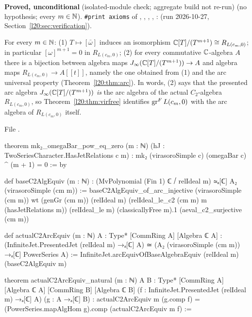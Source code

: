 \begin{status}
\textbf{Proved, unconditional} (isolated-module check; aggregate build not re-run) (no hypothesis; every $m\in{\mathbb{N}}$). \texttt{\#print axioms} of ,
, , , :
 (run 2026-10-27, Section~\ref{l20:sec:verification}).
\end{status}

\begin{theorem}\label{l20:thm:virc2}
For every $m\in{\mathbb{N}}$: (1) $T\mapsto[\bar\omega]$ induces an isomorphism ${\mathbb{C}}[T]/(T^{m+1})\cong R_{L(c_m,0)}$; in particular
$[\omega]^{m+1}=0$ in $R_{L(c_m,0)}$; (2) for every commutative ${\mathbb{C}}$-algebra $A$ there is a bijection between algebra maps
$J_\infty({\mathbb{C}}[T]/(T^{m+1}))\to A$ and algebra maps $R_{L(c_m,0)}\to A[[t]]$, namely the one obtained from (1) and the arc universal
property (Theorem~\ref{l20:thm:arc}). In words, (2) says that the presented arc algebra $J_\infty({\mathbb{C}}[T]/(T^{m+1}))$
\emph{is} the arc algebra of the actual $C_2$-algebra $R_{L(c_m,0)}$, so Theorem~\ref{l20:thm:virfree} identifies $\operatorname{gr}^F L(c_m,0)$
with the arc algebra of $R_{L(c_m,0)}$ itself.
\end{theorem}
\noindent File .
\begin{leancode}
theorem mk₂_omegaBar_pow_eq_zero (m : ℕ) (hJ : TwoSeriesCharacter.HasJetRelations c m) :
    mk₂ (virasoroSimple c) (omegaBar c) ^ (m + 1) = 0 := by

def baseC2AlgEquiv (m : ℕ) :
    (MvPolynomial (Fin 1) ℂ ⧸ relIdeal m) ≃ₐ[ℂ] A₂ (virasoroSimple (cm m)) :=
  baseC2AlgEquiv_of_arc_injective (virasoroSimple (cm m)) wt (genGr (cm m)) (relIdeal m)
    (relIdeal_le_c2 (cm m) m (hasJetRelations m)) (relIdeal_le m) (classicallyFree m).1
    (aeval_c2_surjective (cm m))

def actualC2ArcEquiv (m : ℕ) {A : Type*} [CommRing A] [Algebra ℂ A] :
    (InfiniteJet.PresentedJet (relIdeal m) →ₐ[ℂ] A) ≃
      (A₂ (virasoroSimple (cm m)) →ₐ[ℂ] PowerSeries A) :=
  InfiniteJet.arcEquivOfBaseAlgebraEquiv (relIdeal m) (baseC2AlgEquiv m)

theorem actualC2ArcEquiv_natural (m : ℕ) {A B : Type*} [CommRing A] [Algebra ℂ A]
    [CommRing B] [Algebra ℂ B] (f : InfiniteJet.PresentedJet (relIdeal m) →ₐ[ℂ] A)
    (g : A →ₐ[ℂ] B) :
    actualC2ArcEquiv m (g.comp f) = (PowerSeries.mapAlgHom g).comp (actualC2ArcEquiv m f) :=
\end{leancode}

